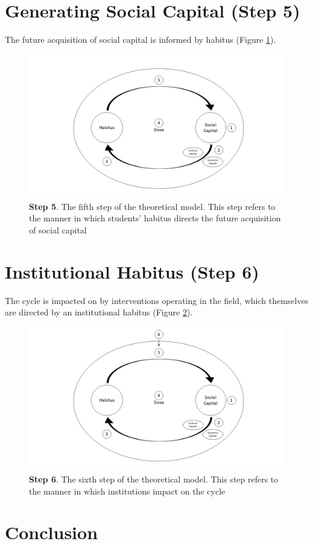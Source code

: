 \section{Generating Social Capital (Step 5)}
The future acquisition of social capital is informed by habitus (Figure \ref{fig:TheoreticalModel5_C5}). 
\begin{figure}[ht]
\centering
\includegraphics[width=\textwidth]{C5 - Understanding Capital Accumulation/HabitusSocCap_TheoreticalModel5.png}
\caption{\label{fig:TheoreticalModel5_C5}\textbf{Step 5}. The fifth step of the theoretical model. This step refers to the manner in which students' habitus directs the future acquisition of social capital}
\end{figure}



\section{Institutional Habitus (Step 6)}
The cycle is impacted on by interventions operating in the field, which themselves are directed by an institutional habitus (Figure \ref{fig:TheoreticalModel6_C5}). 

\begin{figure}[ht]
\centering
\includegraphics[width=\textwidth]{C5 - Understanding Capital Accumulation/HabitusSocCap_TheoreticalModel.png}
\caption{\label{fig:TheoreticalModel6_C5}\textbf{Step 6}. The sixth step of the theoretical model. This step refers to the manner in which institutions impact on the cycle}
\end{figure}



\section{Conclusion}


